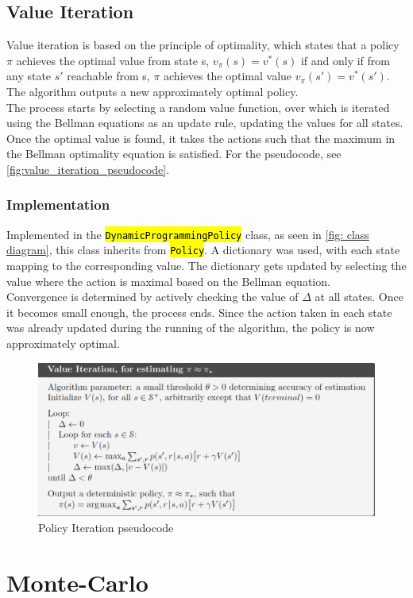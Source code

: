 \documentclass{class}
\def\code#1{\hl{\texttt{#1}}}
\begin{document}
\subsection{Value Iteration}
\label{subsec: value iteration}
Value iteration is based on the principle of optimality, which states that a policy $\pi$ achieves the optimal value from state s, $v_\pi(s) = v^*(s)$ if and only if from any state $s'$ reachable from s, $\pi$ achieves the optimal value $v_\pi(s') = v^*(s')$. The algorithm outputs a new approximately optimal policy. 
\\[0.3cm]
The process starts by selecting a random value function, over which is iterated using the Bellman equations as an update rule, updating the values for all states. Once the optimal value is found, it takes the actions such that the maximum in the Bellman optimality equation is satisfied. For the pseudocode, see \autoref{fig:value_iteration_pseudocode}.

\subsubsection{Implementation}
Implemented in the \code{DynamicProgrammingPolicy} class, as seen in \autoref{fig: class diagram}, this class inherits from \code{Policy}. A dictionary was used, with each state mapping to the corresponding value. The dictionary gets updated by selecting the value where the action is maximal based on the Bellman equation.
\\[0.3cm]
Convergence is determined by actively checking the value of $\Delta$ at all states. Once it becomes small enough, the process ends. Since the action taken in each state was already updated during the running of the algorithm, the policy is now approximately optimal.

\begin{figure}[H]
    \centering
    \includegraphics[width=0.5\linewidth]{images/value_iteration.png}
    \caption{Policy Iteration pseudocode \parencite[p. 80]{sutton-2018}}
    \label{fig:value_iteration_pseudocode}
\end{figure}
\section{Monte-Carlo}
\end{document}

